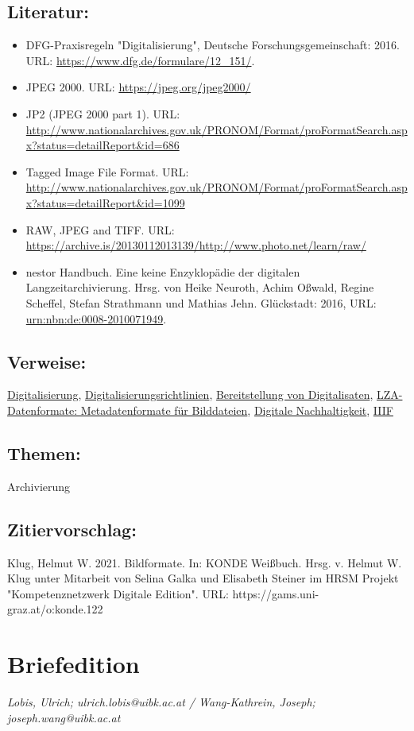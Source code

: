 \documentclass{article}
\begin{document}
        \subsection*{Literatur:}\begin{itemize}\item DFG-Praxisregeln "Digitalisierung", Deutsche Forschungsgemeinschaft: 2016. URL: \url{https://www.dfg.de/formulare/12_151/}.\item JPEG 2000. URL: \url{https://jpeg.org/jpeg2000/}\item JP2 (JPEG 2000 part 1). URL: \url{http://www.nationalarchives.gov.uk/PRONOM/Format/proFormatSearch.aspx?status=detailReport&id=686}\item Tagged Image File Format. URL: \url{http://www.nationalarchives.gov.uk/PRONOM/Format/proFormatSearch.aspx?status=detailReport&id=1099}\item RAW, JPEG and TIFF. URL: \url{https://archive.is/20130112013139/http://www.photo.net/learn/raw/}\item nestor Handbuch. Eine keine Enzyklopädie der digitalen Langzeitarchivierung. Hrsg. von Heike Neuroth, Achim Oßwald, Regine Scheffel, Stefan Strathmann und Mathias Jehn. Glückstadt: 2016, URL: \url{urn:nbn:de:0008-2010071949}.\end{itemize}\subsection*{Verweise:}\href{https://gams.uni-graz.at/o:konde.60}{Digitalisierung}, \href{https://gams.uni-graz.at/o:konde.63}{Digitalisierungsrichtlinien}, \href{https://gams.uni-graz.at/o:konde.36}{Bereitstellung von Digitalisaten}, \href{https://gams.uni-graz.at/o:konde.124}{LZA-Datenformate: Metadatenformate für Bilddateien}, \href{https://gams.uni-graz.at/o:konde.6}{Digitale Nachhaltigkeit}, \href{https://gams.uni-graz.at/o:konde.123}{IIIF}\subsection*{Themen:}Archivierung\subsection*{Zitiervorschlag:}Klug, Helmut W. 2021. Bildformate. In: KONDE Weißbuch. Hrsg. v. Helmut W. Klug unter Mitarbeit von Selina Galka und Elisabeth Steiner im HRSM Projekt "Kompetenznetzwerk Digitale Edition". URL: https://gams.uni-graz.at/o:konde.122\newpage\section*{Briefedition} \emph{Lobis, Ulrich; ulrich.lobis@uibk.ac.at / Wang-Kathrein, Joseph;
                  joseph.wang@uibk.ac.at}\\
        
\end{document}
